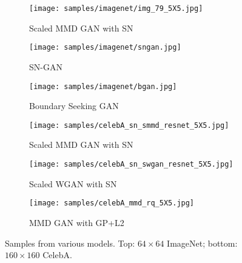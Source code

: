 \documentclass{article}
\begin{document}
\begin{figure}[p]
    \centering
    \begin{subfigure}[t]{0.30\textwidth}
        \centering
        \texttt{[image: samples/imagenet/img\_79\_5X5.jpg]}
        \caption{Scaled MMD GAN with SN}
        \label{fig:imagenet_sn_smmd}
    \end{subfigure}
    \hfill
    \begin{subfigure}[t]{0.30\textwidth}
        \centering
        \texttt{[image: samples/imagenet/sngan.jpg]}
        \caption{SN-GAN} \label{fig:imagenet_sngan}
    \end{subfigure}
    \hfill
    \begin{subfigure}[t]{0.30\textwidth}
        \centering
        \texttt{[image: samples/imagenet/bgan.jpg]}
        \caption{Boundary Seeking GAN} \label{fig:imagenet_bgan}
    \end{subfigure}


    \begin{subfigure}[t]{0.30\textwidth}
        \centering
        \texttt{[image: samples/celebA\_sn\_smmd\_resnet\_5X5.jpg]}
        \caption{Scaled MMD GAN with SN} \label{fig:celebA_sn_smmd}
    \end{subfigure}
    \hfill
    \begin{subfigure}[t]{0.30\textwidth}
        \centering
        \texttt{[image: samples/celebA\_sn\_swgan\_resnet\_5X5.jpg]}
        \caption{Scaled WGAN with SN} \label{fig:celebA_sn_swgan}
    \end{subfigure}
    \hfill
    \begin{subfigure}[t]{0.30\textwidth}
        \centering
        \texttt{[image: samples/celebA\_mmd\_rq\_5X5.jpg]}
        \caption{MMD GAN with GP+L2} \label{fig:celebA_mmd_gp}
    \end{subfigure}
    \caption{Samples from various models. Top: $64 \times 64$ ImageNet; bottom: $160 \times 160$ CelebA.}
\label{fig:samples}
\end{figure}
\end{document}
